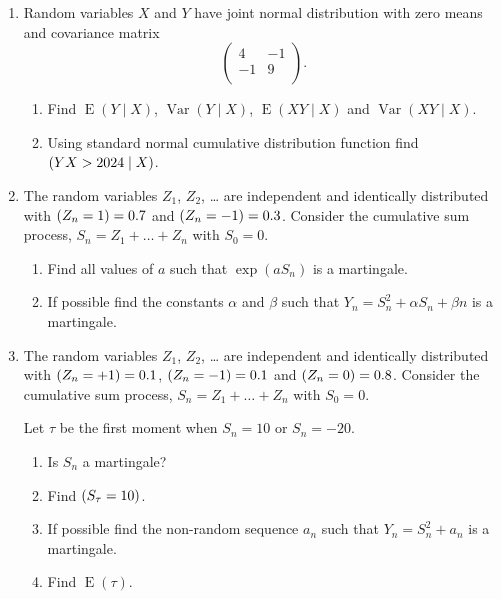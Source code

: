 \documentclass[12pt]{article}
\DeclareMathOperator{\Var}{Var}
\DeclareMathOperator{\E}{E}
\let\P\relax
\DeclareMathOperator{\P}{\mathbb{P}}
\begin{document}
\begin{enumerate}


\item Random variables $X$ and $Y$ have joint normal distribution with zero means and covariance matrix
\[
\begin{pmatrix}
4 & -1 \\
-1 & 9 \\
\end{pmatrix}.
\]

\begin{enumerate}
  \item Find $\E(Y \mid X)$, $\Var(Y \mid X)$, $\E(XY \mid X)$ and $\Var(XY \mid X)$.
  \item Using standard normal cumulative distribution function find $\P(YX > 2024 \mid X)$.
\end{enumerate}


\item The random variables $Z_1$, $Z_2$, \ldots{} are independent and identically distributed 
with $\P(Z_n = 1) = 0.7$ and $\P(Z_n = -1) = 0.3$. 
Consider the cumulative sum process, $S_n = Z_1 + \ldots + Z_n$ with $S_0=0$.

\begin{enumerate}
  \item Find all values of $a$ such that $\exp(aS_n)$ is a martingale.
  \item If possible find the constants $\alpha$ and $\beta$ such that $Y_n = S_n^2 + \alpha S_n + \beta n$ is a martingale.
\end{enumerate}


\item The random variables $Z_1$, $Z_2$, \ldots{} are independent and identically distributed 
with $\P(Z_n = +1) = 0.1$,  $\P(Z_n = -1) = 0.1$ and $\P(Z_n = 0) = 0.8$. 
Consider the cumulative sum process, $S_n = Z_1 + \ldots + Z_n$ with $S_0=0$.

Let $\tau$ be the first moment when $S_n = 10$ or $S_n = -20$.

\begin{enumerate}
  \item Is $S_n$ a martingale?
  \item Find $\P(S_{\tau} = 10)$.
  \item If possible find the non-random sequence $a_n$ such that $Y_n = S_n^2 + a_n$ is a martingale. 
  \item Find $\E(\tau)$.
\end{enumerate}

\end{enumerate}
\end{document}
